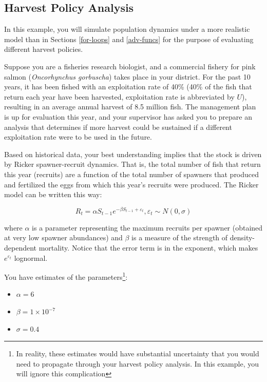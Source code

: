 \documentclass[]{book}
\providecommand{\tightlist}{%
  \setlength{\itemsep}{0pt}\setlength{\parskip}{0pt}}
\let\rmarkdownfootnote\footnote%
\def\footnote{\protect\rmarkdownfootnote}
\theoremstyle{definition}
\theoremstyle{definition}
\theoremstyle{definition}
\theoremstyle{remark}
\begin{document}
\subsection{Harvest Policy Analysis}\label{harv-ex}

In this example, you will simulate population dynamics under a more
realistic model than in Sections \ref{for-loops} and \ref{adv-funcs} for
the purpose of evaluating different harvest policies.

Suppose you are a fisheries research biologist, and a commercial fishery
for pink salmon (\emph{Oncorhynchus gorbuscha}) takes place in your
district. For the past 10 years, it has been fished with an exploitation
rate of 40\% (40\% of the fish that return each year have been
harvested, exploitation rate is abbreviated by \(U\)), resulting in an
average annual harvest of 8.5 million fish. The management plan is up
for evaluation this year, and your supervisor has asked you to prepare
an analysis that determines if more harvest could be sustained if a
different exploitation rate were to be used in the future.

Based on historical data, your best understanding implies that the stock
is driven by Ricker spawner-recruit dynamics. That is, the total number
of fish that return this year (recruits) are a function of the total
number of spawners that produced and fertilized the eggs from which this
year's recruits were produced. The Ricker model can be written this way:

\begin{equation}
  R_t = \alpha S_{t-1} e^{-\beta S_{t-1} + \varepsilon_t} ,\varepsilon_t \sim N(0,\sigma)
\label{eq:ricker-ch4}
\end{equation}

where \(\alpha\) is a parameter representing the maximum recruits per
spawner (obtained at very low spawner abundances) and \(\beta\) is a
measure of the strength of density-dependent mortality. Notice that the
error term is in the exponent, which makes \(e^{\varepsilon_t}\)
lognormal.

You have estimates of the parameters\footnote{In reality, these
  estimates would have substantial uncertainty that you would need to
  propagate through your harvest policy analysis. In this example, you
  will ignore this complication}:

\begin{itemize}
\tightlist
\item
  \(\alpha = 6\)
\item
  \(\beta = 1 \times 10^{-7}\)
\item
  \(\sigma = 0.4\)
\end{itemize}
\end{document}
